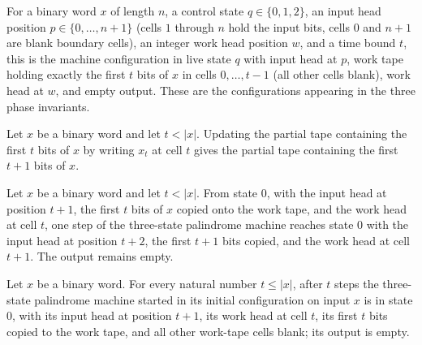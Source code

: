 \begin{definition}
\label{Complexity.palCfg}
\leanok
{}
For a binary word $x$ of length $n$, a control state $q \in \{0,1,2\}$, an input
head position $p \in \{0,\dots,n+1\}$ (cells $1$ through $n$ hold the input bits,
cells $0$ and $n+1$ are blank boundary cells), an integer work head position $w$,
and a time bound $t$, this is the machine configuration in live state $q$ with
input head at $p$, work tape holding exactly the first $t$ bits of $x$ in cells
$0,\dots,t-1$ (all other cells blank), work head at $w$, and empty output. These
are the configurations appearing in the three phase invariants.
\end{definition}

\begin{lemma}
\label{Complexity.palTape_write}
\leanok
{}
Let $x$ be a binary word and let $t<|x|$. Updating the partial tape containing the first
$t$ bits of $x$ by writing $x_t$ at cell $t$ gives the partial tape containing the first
$t+1$ bits of $x$.
\end{lemma}

\begin{lemma}
\label{Complexity.pal_copy_step}
\leanok
{}
Let $x$ be a binary word and let $t<|x|$. From state $0$, with the input head at
position $t+1$, the first $t$ bits of $x$ copied onto the work tape, and the work head
at cell $t$, one step of the three-state palindrome machine reaches state $0$ with the
input head at position $t+2$, the first $t+1$ bits copied, and the work head at cell
$t+1$. The output remains empty.
\end{lemma}

\begin{lemma}
\label{Complexity.pal_copy}
\leanok
{}
Let $x$ be a binary word. For every natural number $t\le |x|$, after $t$ steps the
three-state palindrome machine started in its initial configuration on input $x$ is in
state $0$, with its input head at position $t+1$, its work head at cell $t$, its first
$t$ bits copied to the work tape, and all other work-tape cells blank; its output is
empty.
\end{lemma}


